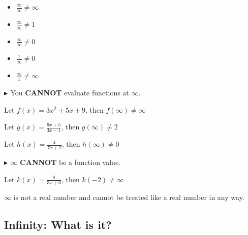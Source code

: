 \documentclass{ximera}
\begin{document}
\begin{example}


\begin{itemize}
\item $\frac{\infty}{\infty} \ne \infty$
\item $\frac{\infty}{\infty} \ne 1$
\item $\frac{\infty}{\infty} \ne 0$
\item $\frac{1}{\infty} \ne 0$
\item $\frac{\infty}{1} \ne \infty$
\end{itemize}


\end{example}








\textbf{\textcolor{red!70!darkgray}{$\blacktriangleright$ }} You \textbf{\textcolor{red!70!black}{CANNOT}} evaluate functions at $\infty$.



\begin{example}


Let $f(x) = 3x^2 + 5x + 9$, then $f(\infty) \ne \infty$ 

Let $g(x) = \frac{6x + 5}{3x - 1}$, then $g(\infty) \ne 2$ 

Let $h(x) = \frac{4}{7x + 2}$, then $h(\infty) \ne 0$ 

\end{example}











\textbf{\textcolor{red!70!darkgray}{$\blacktriangleright$ }} $\infty$ \textbf{\textcolor{red!70!black}{CANNOT}} be a function value.



\begin{example}



Let $k(x) = \frac{8}{3x + 6}$, then $k(-2) \ne \infty$ 

\end{example}

$\infty$ is not a real number and cannot be treated like a real number in any way.








\subsection*{Infinity: What is it?}
\end{document}
